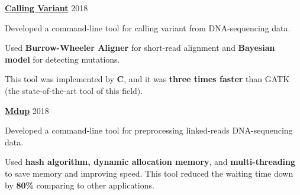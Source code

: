 

\begin{cventries}

  \cvsimpleentry
    {\href{https://github.com/tuan-tt/calling_variant}{\textbf{Calling Variant}}} %
    {2018} %
    {
      \begin{cvitems} %
        \item {Developed a command-line tool for calling variant from DNA-sequencing data.}
        \item {Used \textbf{Burrow-Wheeler Aligner} for short-read alignment and \textbf{Bayesian model} for detecting mutations.}
        \item {This tool was implemented by \textbf{C}, and it was \textbf{three times faster} than GATK (the state-of-the-art tool of this field).}
      \end{cvitems}
    }

  \cvsimpleentry
    {\href{https://github.com/kspham/mdup}{\textbf{Mdup}}} %
    {2018} %
    {
      \begin{cvitems} %
        \item {Developed a command-line tool for preprocessing linked-reads DNA-sequencing data.}
        \item {Used \textbf{hash algorithm, dynamic allocation memory}, and \textbf{multi-threading} to save memory and improving speed. This tool reduced the waiting time down by \textbf{80\%} comparing to other applications.}
      \end{cvitems}
    }

\end{cventries}
